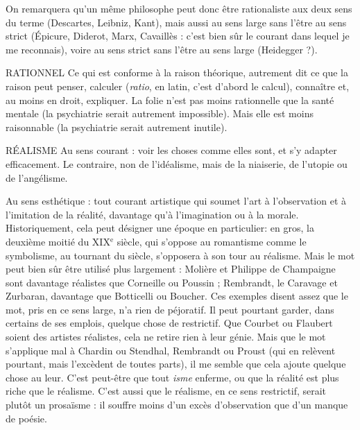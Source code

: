 On remarquera qu’un même philosophe peut donc être rationaliste aux
deux sens du terme (Descartes, Leibniz, Kant), mais aussi au sens large sans
l’être au sens strict (Épicure, Diderot, Marx, Cavaillès : c’est bien sûr le courant
dans lequel je me reconnais), voire au sens strict sans l’être au sens large (Heidegger ?).

RATIONNEL Ce qui est conforme à la raison théorique, autrement dit ce
que la raison peut penser, calculer ({\it ratio}, en latin, c’est
d’abord le calcul), connaître et, au moins en droit, expliquer. La folie n’est pas
moins rationnelle que la santé mentale (la psychiatrie serait autrement impossible).
Mais elle est moins raisonnable (la psychiatrie serait autrement inutile).

RÉALISME Au sens courant : voir les choses comme elles sont, et s’y adapter
efficacement. Le contraire, non de l’idéalisme, mais de la niaiserie,
de l’utopie ou de l’angélisme.

Au sens esthétique : tout courant artistique qui soumet l’art à l'observation
et à l’imitation de la réalité, davantage qu’à l’imagination ou à la morale. Historiquement,
cela peut désigner une époque en particulier: en gros, la
deuxième moitié du {\footnotesize XIX$^\text{e}$} siècle, qui s'oppose au romantisme comme le symbolisme,
au tournant du siècle, s’opposera à son tour au réalisme. Mais le mot
peut bien sûr être utilisé plus largement : Molière et Philippe de Champaigne
sont davantage réalistes que Corneille ou Poussin ; Rembrandt, le Caravage et
Zurbaran, davantage que Botticelli ou Boucher. Ces exemples disent assez que
le mot, pris en ce sens large, n’a rien de péjoratif. Il peut pourtant garder, dans
certains de ses emplois, quelque chose de restrictif. Que Courbet ou Flaubert
soient des artistes réalistes, cela ne retire rien à leur génie. Mais que le mot
s'applique mal à Chardin ou Stendhal, Rembrandt ou Proust (qui en relèvent
pourtant, mais l’excèdent de toutes parts), il me semble que cela ajoute quelque
chose au leur. C’est peut-être que tout {\it isme} enferme, ou que la réalité est plus
riche que le réalisme. C’est aussi que le réalisme, en ce sens restrictif, serait
plutôt un prosaïsme : il souffre moins d’un excès d’observation que d’un
manque de poésie.

